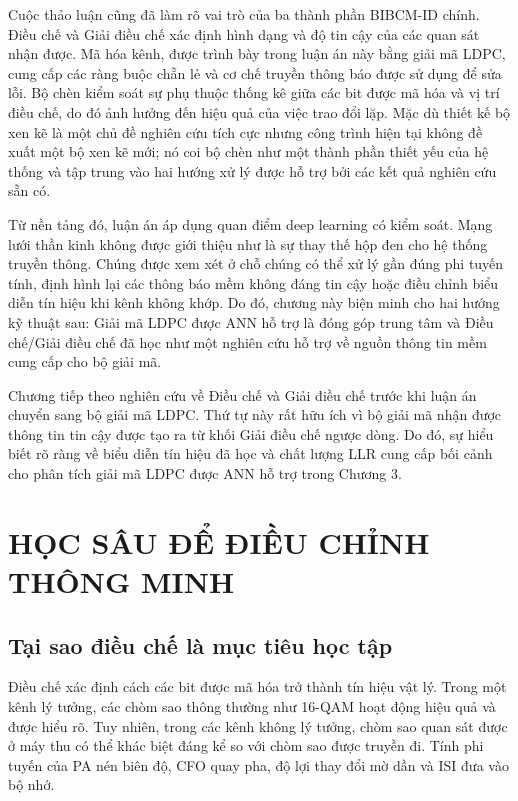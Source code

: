 Cuộc thảo luận cũng đã làm rõ vai trò của ba thành phần BIBCM-ID chính. Điều chế và Giải điều chế xác định hình dạng và độ tin cậy của các quan sát nhận được. Mã hóa kênh, được trình bày trong luận án này bằng giải mã LDPC, cung cấp các ràng buộc chẵn lẻ và cơ chế truyền thông báo được sử dụng để sửa lỗi. Bộ chèn kiểm soát sự phụ thuộc thống kê giữa các bit được mã hóa và vị trí điều chế, do đó ảnh hưởng đến hiệu quả của việc trao đổi lặp. Mặc dù thiết kế bộ xen kẽ là một chủ đề nghiên cứu tích cực nhưng công trình hiện tại không đề xuất một bộ xen kẽ mới; nó coi bộ chèn như một thành phần thiết yếu của hệ thống và tập trung vào hai hướng xử lý được hỗ trợ bởi các kết quả nghiên cứu sẵn có.

Từ nền tảng đó, luận án áp dụng quan điểm deep learning có kiểm soát. Mạng lưới thần kinh không được giới thiệu như là sự thay thế hộp đen cho hệ thống truyền thông. Chúng được xem xét ở chỗ chúng có thể xử lý gần đúng phi tuyến tính, định hình lại các thông báo mềm không đáng tin cậy hoặc điều chỉnh biểu diễn tín hiệu khi kênh không khớp. Do đó, chương này biện minh cho hai hướng kỹ thuật sau: Giải mã LDPC được ANN hỗ trợ là đóng góp trung tâm và Điều chế/Giải điều chế đã học như một nghiên cứu hỗ trợ về nguồn thông tin mềm cung cấp cho bộ giải mã.

Chương tiếp theo nghiên cứu về Điều chế và Giải điều chế trước khi luận án chuyển sang bộ giải mã LDPC. Thứ tự này rất hữu ích vì bộ giải mã nhận được thông tin tin cậy được tạo ra từ khối Giải điều chế ngược dòng. Do đó, sự hiểu biết rõ ràng về biểu diễn tín hiệu đã học và chất lượng LLR cung cấp bối cảnh cho phân tích giải mã LDPC được ANN hỗ trợ trong Chương 3.

\chapter[\textbf{HỌC SÂU CHO ĐIỀU CHỈNH}]{HỌC SÂU ĐỂ ĐIỀU CHỈNH THÔNG MINH}
\section{Tại sao điều chế là mục tiêu học tập}
Điều chế xác định cách các bit được mã hóa trở thành tín hiệu vật lý. Trong một kênh lý tưởng, các chòm sao thông thường như 16-QAM hoạt động hiệu quả và được hiểu rõ. Tuy nhiên, trong các kênh không lý tưởng, chòm sao quan sát được ở máy thu có thể khác biệt đáng kể so với chòm sao được truyền đi. Tính phi tuyến của PA nén biên độ, CFO quay pha, độ lợi thay đổi mờ dần và ISI đưa vào bộ nhớ.

